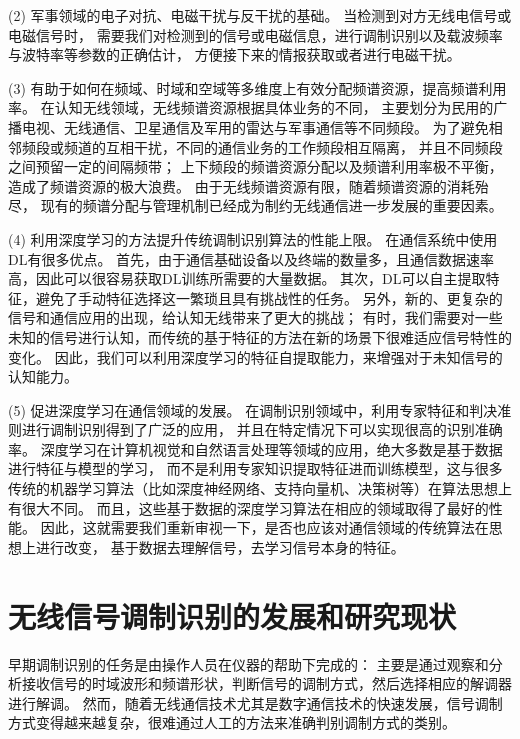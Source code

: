 (2) 军事领域的电子对抗、电磁干扰与反干扰的基础。
当检测到对方无线电信号或电磁信号时，
需要我们对检测到的信号或电磁信息，进行调制识别以及载波频率与波特率等参数的正确估计，
方便接下来的情报获取或者进行电磁干扰。\par

(3) 有助于如何在频域、时域和空域等多维度上有效分配频谱资源，提高频谱利用率。
在认知无线领域，无线频谱资源根据具体业务的不同，
主要划分为民用的广播电视、无线通信、卫星通信及军用的雷达与军事通信等不同频段。
为了避免相邻频段或频道的互相干扰，不同的通信业务的工作频段相互隔离，
并且不同频段之间预留一定的间隔频带；
上下频段的频谱资源分配以及频谱利用率极不平衡，造成了频谱资源的极大浪费。
由于无线频谱资源有限，随着频谱资源的消耗殆尽，
现有的频谱分配与管理机制已经成为制约无线通信进一步发展的重要因素。\par

(4) 利用深度学习的方法提升传统调制识别算法的性能上限。
在通信系统中使用DL有很多优点。 首先，由于通信基础设备以及终端的数量多，且通信数据速率高，因此可以很容易获取DL训练所需要的大量数据。
其次，DL可以自主提取特征，避免了手动特征选择这一繁琐且具有挑战性的任务。
另外，新的、更复杂的信号和通信应用的出现，给认知无线带来了更大的挑战；
有时，我们需要对一些未知的信号进行认知，而传统的基于特征的方法在新的场景下很难适应信号特性的变化。
因此，我们可以利用深度学习的特征自提取能力，来增强对于未知信号的认知能力。\par

(5) 促进深度学习在通信领域的发展。
在调制识别领域中，利用专家特征和判决准则进行调制识别得到了广泛的应用，
并且在特定情况下可以实现很高的识别准确率。
深度学习在计算机视觉和自然语言处理等领域的应用，绝大多数是基于数据进行特征与模型的学习，
而不是利用专家知识提取特征进而训练模型，这与很多传统的机器学习算法（比如深度神经网络、支持向量机、决策树等）在算法思想上有很大不同。
而且，这些基于数据的深度学习算法在相应的领域取得了最好的性能。
因此，这就需要我们重新审视一下，是否也应该对通信领域的传统算法在思想上进行改变，
基于数据去理解信号，去学习信号本身的特征。\par

\section{无线信号调制识别的发展和研究现状}

早期调制识别的任务是由操作人员在仪器的帮助下完成的：
主要是通过观察和分析接收信号的时域波形和频谱形状，判断信号的调制方式，然后选择相应的解调器进行解调。
然而，随着无线通信技术尤其是数字通信技术的快速发展，信号调制方式变得越来越复杂，很难通过人工的方法来准确判别调制方式的类别。 \par

